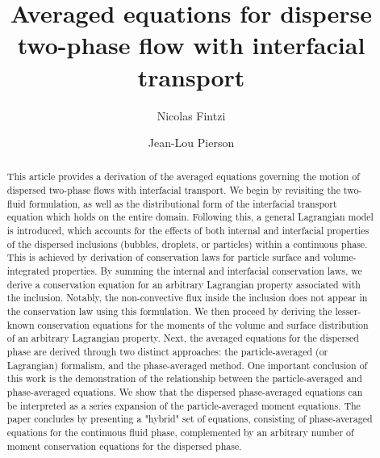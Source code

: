 \documentclass[11pt]{My_preprint}
\title{Averaged equations for disperse two-phase flow with interfacial transport}
\author[1,2]{Nicolas Fintzi}
\author[1]{Jean-Lou Pierson}
\affil[1]{IFP Energies Nouvelles, Rond-point de l'echangeur de Solaize, 69360 Solaize}
\affil[2]{Sorbonne Universit\'e, Institut Jean le Rond $\partial$'Alembert, 4 place Jussieu, 75252 PARIS CEDEX 05, France}
\begin{document}
\maketitle

\begin{abstract}
This article provides a derivation of the averaged equations governing the motion of dispersed two-phase flows with interfacial transport. 
We begin by revisiting the two-fluid formulation, as well as the distributional form of the interfacial transport equation which holds on the entire domain. 
Following this, a general Lagrangian model is introduced, which accounts for the effects of both internal and interfacial properties of the dispersed inclusions (bubbles, droplets, or particles) within a continuous phase.
This is achieved by derivation of conservation laws for particle surface and volume-integrated properties. 
By summing the internal and interfacial conservation laws, we derive a conservation equation for an arbitrary Lagrangian property associated with the inclusion. 
Notably, the non-convective flux inside the inclusion does not appear in the conservation law using this formulation. 
We then proceed by deriving the lesser-known conservation equations for the moments of the volume and surface distribution of an arbitrary Lagrangian property.  
Next, the averaged equations for the dispersed phase are derived through two distinct approaches: the particle-averaged (or Lagrangian) formalism, and the phase-averaged method. 
One important conclusion of this work is the demonstration of the relationship between the particle-averaged and phase-averaged equations. 
We show that the dispersed phase-averaged equations can be interpreted as a series expansion of the particle-averaged moment equations. 
The paper concludes by presenting a "hybrid" set of equations, consisting of phase-averaged equations for the continuous fluid phase, complemented by an arbitrary number of moment conservation equations for the dispersed phase.
\end{abstract}







\end{document}

